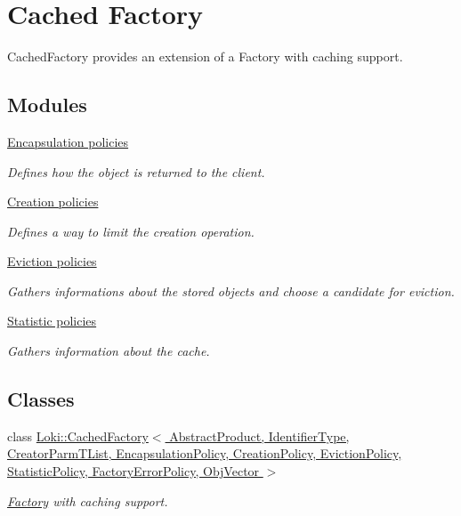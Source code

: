 \hypertarget{group__CachedFactoryGroup}{}\section{Cached Factory}
\label{group__CachedFactoryGroup}


Cached\+Factory provides an extension of a Factory with caching support.  


\subsection*{Modules}
\begin{DoxyCompactItemize}
\item 
\hyperlink{group__EncapsulationPolicyCachedFactoryGroup}{Encapsulation policies}
\begin{DoxyCompactList}\small\item\em Defines how the object is returned to the client. \end{DoxyCompactList}\item 
\hyperlink{group__CreationPolicyCachedFactoryGroup}{Creation policies}
\begin{DoxyCompactList}\small\item\em Defines a way to limit the creation operation. \end{DoxyCompactList}\item 
\hyperlink{group__EvictionPolicyCachedFactoryGroup}{Eviction policies}
\begin{DoxyCompactList}\small\item\em Gathers informations about the stored objects and choose a candidate for eviction. \end{DoxyCompactList}\item 
\hyperlink{group__StatisticPolicyCachedFactoryGroup}{Statistic policies}
\begin{DoxyCompactList}\small\item\em Gathers information about the cache. \end{DoxyCompactList}\end{DoxyCompactItemize}
\subsection*{Classes}
\begin{DoxyCompactItemize}
\item 
class \hyperlink{classLoki_1_1CachedFactory}{Loki\+::\+Cached\+Factory$<$ Abstract\+Product, Identifier\+Type, Creator\+Parm\+T\+List, Encapsulation\+Policy, Creation\+Policy, Eviction\+Policy, Statistic\+Policy, Factory\+Error\+Policy, Obj\+Vector $>$}
\begin{DoxyCompactList}\small\item\em \hyperlink{classLoki_1_1Factory}{Factory} with caching support. \end{DoxyCompactList}\end{DoxyCompactItemize}


